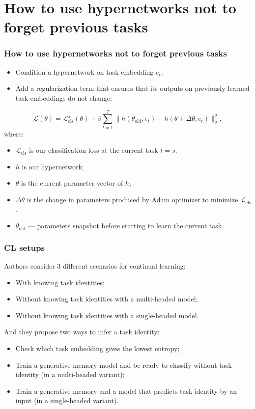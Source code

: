 \documentclass[10pt]{beamer}
\begin{document}
\section{How to use hypernetworks not to forget previous tasks}
\begin{frame}
    \frametitle{How to use hypernetworks not to forget previous tasks}
    
    \begin{itemize}
        \item Condition a hypernetwork on task embedding $e_t$.
        \item Add a regularization term that ensures that its outputs on previously learned task embeddings do not change:
    \end{itemize}
    
    \begin{equation*}
        \mathcal{L}(\theta) = \mathcal{L}^s_\text{cls}(\theta) + \beta \sum_{t=1}^T \| h(\theta_\text{old}, e_t) - h(\theta + \Delta \theta, e_t) \|_2^2,
    \end{equation*}
    where:
    \begin{itemize}
        \item $\mathcal{L}_\text{cls}$ is our classification loss at the current task $t = s$;
        \item $h$ is our hypernetwork;
        \item $\theta$ is the current parameter vector of $h$;
        \item $\Delta \theta$ is the change in parameters produced by Adam optimizer to minimize $\mathcal{L}_\text{cls}$.
        \item $\theta_\text{old}$ --- parameters snapshot before starting to learn the current task.
    \end{itemize}
\end{frame}


\begin{frame}
    \frametitle{CL setups}
    Authors consider 3 different scenarios for continual learning:
    
    \begin{itemize}
        \item With knowing task identities;
        \item Without knowing task identities with a multi-headed model;
        \item Without knowing task identities with a single-headed model.
    \end{itemize}
    
    And they propose two ways to infer a task identity:
    \begin{itemize}
        \item Check which task embedding gives the lowest entropy;
        \item Train a generative memory model and be ready to classify without task identity (in a multi-headed variant);
        \item Train a generative memory and a model that predicts task identity by an input (in a single-headed variant).
    \end{itemize}
\end{frame}
\end{document}
